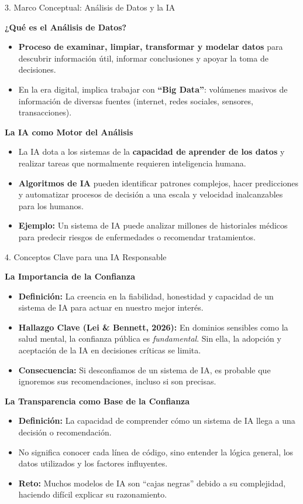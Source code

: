 \documentclass[aspectratio=169]{beamer}
\begin{document}
\begin{frame}[fragile]{3. Marco Conceptual: Análisis de Datos y la IA}


\textbf{¿Qué es el Análisis de Datos?}
\begin{itemize}
  \item \textbf{Proceso de examinar, limpiar, transformar y modelar datos} para descubrir información útil, informar conclusiones y apoyar la toma de decisiones.
  \item En la era digital, implica trabajar con \textbf{``Big Data''}: volúmenes masivos de información de diversas fuentes (internet, redes sociales, sensores, transacciones).
\end{itemize}
\textbf{La IA como Motor del Análisis}
\begin{itemize}
  \item La IA dota a los sistemas de la \textbf{capacidad de aprender de los datos} y realizar tareas que normalmente requieren inteligencia humana.
  \item \textbf{Algoritmos de IA} pueden identificar patrones complejos, hacer predicciones y automatizar procesos de decisión a una escala y velocidad inalcanzables para los humanos.
  \item \textbf{Ejemplo:} Un sistema de IA puede analizar millones de historiales médicos para predecir riesgos de enfermedades o recomendar tratamientos.
\end{itemize}
\end{frame}



\begin{frame}[fragile]{4. Conceptos Clave para una IA Responsable}


\textbf{La Importancia de la Confianza}
\begin{itemize}
  \item \textbf{Definición:} La creencia en la fiabilidad, honestidad y capacidad de un sistema de IA para actuar en nuestro mejor interés.
  \item \textbf{Hallazgo Clave (Lei \& Bennett, 2026):} En dominios sensibles como la salud mental, la confianza pública es \textit{fundamental}. Sin ella, la adopción y aceptación de la IA en decisiones críticas se limita.
  \item \textbf{Consecuencia:} Si desconfiamos de un sistema de IA, es probable que ignoremos sus recomendaciones, incluso si son precisas.
\end{itemize}
\textbf{La Transparencia como Base de la Confianza}
\begin{itemize}
  \item \textbf{Definición:} La capacidad de comprender cómo un sistema de IA llega a una decisión o recomendación.
  \item No significa conocer cada línea de código, sino entender la lógica general, los datos utilizados y los factores influyentes.
  \item \textbf{Reto:} Muchos modelos de IA son ``cajas negras'' debido a su complejidad, haciendo difícil explicar su razonamiento.
\end{itemize}
\end{frame}
\end{document}
